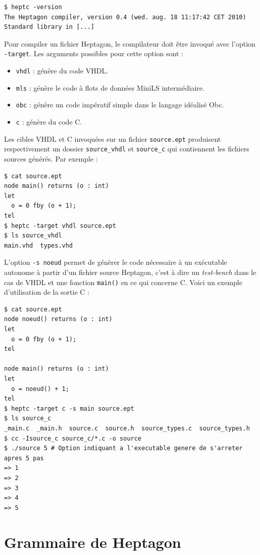 \documentclass[a4paper]{article}
\newcommand{\LANG}{{\sc Heptagon}}
\begin{document}
\begin{verbatim}
$ heptc -version
The Heptagon compiler, version 0.4 (wed. aug. 18 11:17:42 CET 2010)
Standard library in [...]
\end{verbatim}

Pour compiler un fichier \LANG, le compilateur doit \^etre invoqu\'e avec l'option
\verb/-target/. Les arguments possibles pour cette option sont :

\begin{itemize}
\item \verb/vhdl/ : g\'en\`ere du code VHDL.
\item \verb/mls/ : g\'en\`ere le code \`a flots de donn\'ees MiniLS interm\'ediaire.
\item \verb/obc/ : g\'en\`ere un code imp\'eratif simple dans le langage id\'ealis\'e Obc.
\item \verb/c/ : g\'en\`ere du code C.
\end{itemize}

Les cibles VHDL et C invoqu\'ees sur un fichier \verb/source.ept/ produisent
respectivement un dossier \verb/source_vhdl/ et \verb/source_c/ qui contiennent
les fichiers sources g\'en\'er\'es. Par exemple :

\begin{verbatim}
$ cat source.ept
node main() returns (o : int)
let
  o = 0 fby (o + 1);
tel
$ heptc -target vhdl source.ept
$ ls source_vhdl
main.vhd  types.vhd
\end{verbatim}

L'option \verb/-s noeud/ permet de g\'en\`erer le code n\'ecessaire \`a un
ex\'ecutable autonome \`a partir d'un fichier source \LANG, c'est \`a dire un
\textit{test-bench} dans le cas de VHDL et une fonction \verb/main()/ en ce qui
concerne C. Voici un exemple d'utilisation de la sortie C :

\begin{verbatim}
$ cat source.ept
node noeud() returns (o : int)
let
  o = 0 fby (o + 1);
tel

node main() returns (o : int)
let
  o = noeud() + 1;
tel
$ heptc -target c -s main source.ept
$ ls source_c
_main.c  _main.h  source.c  source.h  source_types.c  source_types.h
$ cc -Isource_c source_c/*.c -o source
$ ./source 5 # Option indiquant a l'executable genere de s'arreter apres 5 pas
=> 1
=> 2
=> 3
=> 4
=> 5
\end{verbatim}

\section{Grammaire de \LANG}
\end{document}
